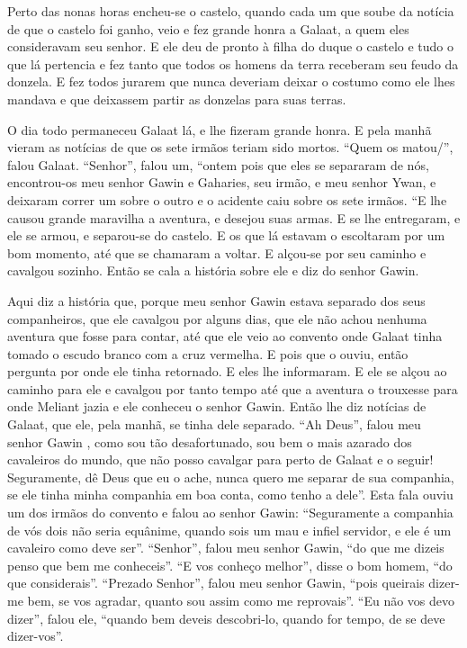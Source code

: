 Perto das nonas horas encheu-se o castelo, quando cada um que soube da notícia
de que o castelo foi ganho, veio e fez grande honra a Galaat, a quem eles
consideravam seu senhor. E ele deu de pronto à filha do duque o castelo e tudo
o que lá pertencia e fez tanto que todos os homens da terra receberam seu feudo
da donzela. E fez todos jurarem que nunca deveriam deixar o costumo como ele
lhes mandava e que deixassem partir as donzelas para suas terras.

O dia todo permaneceu Galaat lá, e lhe fizeram grande honra. E pela manhã vieram
as notícias de que os sete irmãos teriam sido mortos. “Quem os matou/”, falou
Galaat. “Senhor”, falou um, “ontem pois que eles se separaram de nós,
encontrou-os meu senhor Gawin e Gaharies, seu irmão, e meu senhor Ywan, e
deixaram correr um sobre o outro e o acidente caiu sobre os sete irmãos. “E lhe
causou grande maravilha a aventura, e desejou suas armas. E se lhe entregaram,
e ele se armou, e separou-se do castelo. E os que lá estavam o escoltaram por
um bom momento, até que se chamaram a voltar. E alçou-se por seu caminho e
cavalgou sozinho. Então se cala a história sobre ele e diz do senhor Gawin. 

Aqui diz a história que, porque meu senhor Gawin  estava separado dos
seus companheiros, que ele cavalgou por alguns dias, que ele não achou nenhuma
aventura que fosse para contar, até que ele veio ao convento onde Galaat tinha
tomado o escudo branco com a cruz vermelha. E pois que o ouviu, então pergunta
por onde ele tinha retornado. E eles lhe informaram. E ele se alçou ao caminho
para ele e cavalgou por tanto tempo até que a aventura o trouxesse para onde
Meliant jazia e ele conheceu o senhor Gawin. Então lhe diz notícias de Galaat,
que ele, pela manhã, se tinha dele separado. “Ah Deus”, falou meu senhor Gawin
, como sou tão desafortunado, sou bem o mais azarado dos cavaleiros do
mundo, que não posso cavalgar para perto de Galaat e o seguir! Seguramente, dê
Deus que eu o ache, nunca quero me separar de sua companhia, se ele tinha minha
companhia em boa conta, como tenho a dele”. Esta fala ouviu um dos irmãos do
convento e falou ao senhor Gawin: “Seguramente a companhia de vós dois não
seria equânime, quando sois um mau e infiel servidor,  e ele é um cavaleiro
como deve ser”.  “Senhor”, falou meu senhor Gawin,  “do que me dizeis
penso que bem me conheceis”. “E vos conheço melhor”, disse o bom homem, “do que
considerais”. “Prezado Senhor”, falou meu senhor Gawin,  “pois queirais
dizer-me bem, se vos agradar, quanto sou assim como me reprovais”. “Eu não vos
devo dizer”, falou ele, “quando bem deveis descobri-lo, quando for tempo, de se
deve dizer-vos”. 

